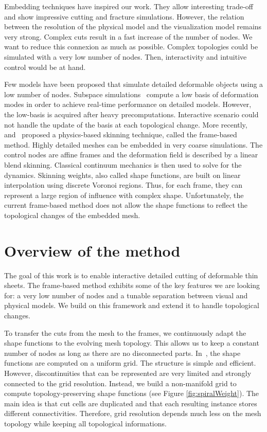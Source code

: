Embedding techniques have inspired our work. They allow interesting trade-off and show impressive cutting and fracture simulations. However, the relation between the resolution of the physical model and the visualization model remains very strong. Complex cuts result in a fast increase of the number of nodes. We want to reduce this connexion as much as possible. Complex topologies could be simulated with a very low number of nodes. Then, interactivity and intuitive control would be at hand.

Few models have been proposed that simulate detailed deformable objects using a low number of nodes. 
Subspace simulations~\cite{Barbic:2005:RTSI} compute a low basis of deformation modes in order to achieve real-time performance on detailed models. 
However, the low-basis is acquired after heavy precomputations. 
Interactive scenario could not handle the update of the basis at each topological change. 
More recently,~\cite{Gilles2011} and~\cite{Faure2011} proposed a physics-based skinning technique, called the frame-based method. 
Highly detailed meshes can be embedded in very coarse simulations. 
The control nodes are affine frames and the deformation field is described by a linear blend skinning. 
Classical continuum mechanics is then used to solve for the dynamics. 
Skinning weights, also called shape functions, are built on linear interpolation using discrete Voronoi regions. 
Thus, for each frame, they can represent a large region of influence with complex shape. 
Unfortunately, the current frame-based method does not allow the shape functions to reflect the topological changes of the embedded mesh.

\section{Overview of the method}

The goal of this work is to enable interactive detailed cutting of deformable thin sheets. 
The frame-based method exhibits some of the key features we are looking for: a very low number of nodes and a tunable separation between visual and physical models.  
We build on this framework and extend it to handle topological changes.

To transfer the cuts from the mesh to the frames, we continuously adapt the shape functions to the evolving mesh topology. 
This allows us to keep a constant number of nodes as long as there are no disconnected parts. 
In~\cite{Faure2011}, the shape functions are computed on a uniform grid.
The structure is simple and efficient. 
However, discontinuities that can be represented are very limited and strongly connected to the grid resolution. 
Instead, we build a non-manifold grid to compute topology-preserving shape functions (see Figure \ref{fig:spiralWeight}). 
The main idea is that cut cells are duplicated and that each resulting instance stores different connectivities. 
Therefore, grid resolution depends much less on the mesh topology while keeping all topological informations.

